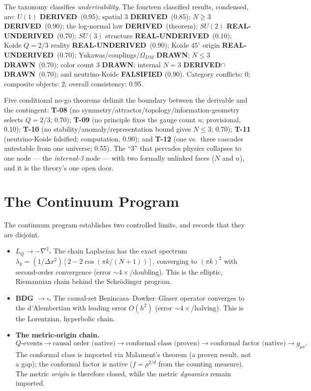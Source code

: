 \documentclass[10pt,a4paper]{article}
\newcommand{\derived}{\textbf{DERIVED}}
\newcommand{\realunder}{\textbf{REAL-UNDERIVED}}
\newcommand{\drawn}{\textbf{DRAWN}}
\begin{document}
The taxonomy classifies \emph{underivability}. The fourteen classified results, condensed,
are: $U(1)$ \derived\ (0.95); spatial 3 \derived\ (0.85); $N\ge3$ \derived\ (0.90);
the log-normal law \derived\ (theorem); $SU(2)$ \realunder\ (0.70); $SU(3)$ structure
\realunder\ (0.10); Koide $Q=2/3$ reality \realunder\ (0.90); Koide $45^\circ$ origin
\realunder\ (0.70); Yukawas/couplings/$\Omega_{DM}$ \drawn; $N\le3$ \drawn\ (0.70);
color count 3 \drawn; internal $N=3$ \derived$\cap$\drawn\ (0.70); and neutrino-Koide
\textbf{FALSIFIED} (0.90). Category conflicts: 0; composite objects: 2; overall
consistency: 0.95.

Five conditional no-go theorems delimit the boundary between the derivable and the
contingent: \textbf{T-08} (no symmetry/attractor/topology/information-geometry selects
$Q=2/3$; 0.70); \textbf{T-09} (no principle fixes the gauge count $n$; provisional, 0.10);
\textbf{T-10} (no stability/anomaly/representation bound gives $N\le3$; 0.70); \textbf{T-11}
(neutrino-Koide falsified; computation, 0.90); and \textbf{T-12} (one vs.\ three cascades
untestable from one universe; 0.55). The ``3'' that pervades physics collapses to one node
--- the \emph{internal-3} node --- with two formally unlinked faces ($N$ and $n$), and it is
the theory's one open door.

\section{The Continuum Program}

The continuum program establishes two controlled limits, and records that they are
disjoint.

\begin{itemize}
\item \textbf{$L_Q\to-\nabla^2$.} The chain Laplacian has the exact spectrum
$\lambda_k=(1/\Delta x^2)[2-2\cos(\pi k/(N{+}1))]$, converging to $(\pi k)^2$ with
second-order convergence (error $\sim4\times$/doubling). This is the elliptic, Riemannian
chain behind the Schr\"odinger program.
\item \textbf{BDG $\to\square$.} The causal-set Benincasa--Dowker--Glaser operator
converges to the d'Alembertian with leading error $O(h^2)$ (error $\sim4\times$/halving).
This is the Lorentzian, hyperbolic chain.
\item \textbf{The metric-origin chain.}
\begin{equation}
Q\text{-events}\to\text{causal order (native)}\to\text{conformal class (proven)}
\to\text{conformal factor (native)}\to g_{\mu\nu}.
\end{equation}
The conformal class is imported via Malament's theorem (a proven result, not a gap); the
conformal factor is native ($f=\rho^{2/d}$ from the counting measure). The metric
\emph{origin} is therefore closed, while the metric \emph{dynamics} remain imported.
\end{itemize}
\end{document}
